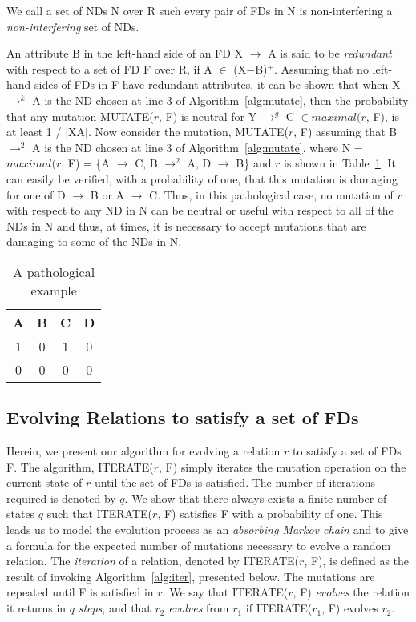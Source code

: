 We call a set of NDs N over R such every pair of FDs in N is non-interfering a
{\em non-interfering} set of NDs.

\medskip

An attribute B in the left-hand side of an FD X $\to$ A is said to be 
{\em redundant} with respect to a set of FD F over R, if A $\in$ (X$-$B)${}^+$.
Assuming that no left-hand sides of FDs in F have redundant attributes,
it can be shown that when X $\to^k$ A is the ND chosen at line 3 of 
Algorithm~\ref{alg:mutate}, then the probability that any mutation MUTATE($r$, F)
is neutral for Y $\to^g$ C $\in maximal(r$, F), is at least 1 / $\mid$XA$\mid$.
Now consider the mutation, MUTATE($r$, F) assuming that 
B $\to^2$ A is the ND chosen at line 3 of Algorithm~\ref{alg:mutate},
where N = $maximal(r$, F) = \{A $\to$ C, B $\to^2$ A, D $\to$ B\}
and $r$ is shown in Table~\ref{tbl17}.
It can easily be verified, with a probability of one, that this mutation is 
damaging for one of D $\to$ B or A $\to$ C.
Thus, in this pathological case, no mutation of $r$ with respect to 
any ND in N can be neutral or useful with respect to all of the NDs in N
and thus, at times, it is necessary to accept mutations that are damaging 
to some of the NDs in N. 

{\line
\begin{table}[ht]
\begin{center}
\begin{tabular}{|c|c|c|c|} \hline
A & B & C & D \\ \hline
1 & 0 & 1 & 0 \\
0 & 0 & 0 & 0 \\ \hline
\end{tabular}
\end{center}
\caption{\label{tbl17} A pathological example}
\end{table}
}
\medskip


\subsection{Evolving Relations to satisfy a set of FDs}
\label{sec:evolve}


Herein, we present our algorithm for evolving a relation $r$ to satisfy a set
of FDs F. The algorithm, ITERATE($r$, F) simply iterates 
the mutation operation on the current state of $r$ until the set of
FDs is satisfied. The number of iterations required is denoted by $q$.
We show that there always exists a finite number of states $q$
such that ITERATE($r$, F) satisfies F with a probability of one.
This leads us to model the evolution process as an 
{\em absorbing Markov chain} \cite{ks60} and to give a 
formula for the expected number of mutations necessary to
evolve a random relation.
The {\em iteration} of a relation, denoted by ITERATE($r$, F),
is defined as the result of invoking Algorithm~\ref{alg:iter},
presented below. The mutations are repeated until F is satisfied in $r$.
We say that ITERATE($r$, F) {\em evolves} the relation it returns
in $q$ {\em steps}, and that $r_2$ {\em evolves} from $r_1$
if ITERATE($r_1$, F) evolves $r_2$.

